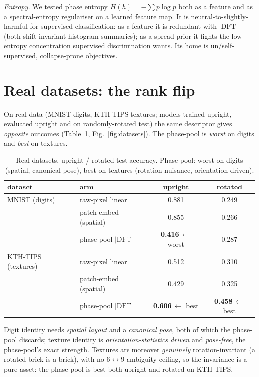 \documentclass[11pt]{article}
\begin{document}
\emph{Entropy.} We tested phase entropy $H(h)=-\sum p\log p$ both as a feature and as a
spectral-entropy regulariser on a learned feature map. It is neutral-to-slightly-harmful for
supervised classification: as a feature it is redundant with $|\mathrm{DFT}|$ (both shift-invariant
histogram summaries); as a spread prior it fights the low-entropy concentration supervised
discrimination wants. Its home is un/self-supervised, collapse-prone objectives.

\section{Real datasets: the rank flip}
On real data (MNIST digits, KTH-TIPS textures; models trained upright, evaluated upright and on
randomly-rotated test) the same descriptor gives \emph{opposite} outcomes (Table~\ref{tab:real},
Fig.~\ref{fig:datasets}). The phase-pool is \emph{worst} on digits and \emph{best} on textures.

\begin{table}[t]
\centering
\caption{Real datasets, upright / rotated test accuracy. Phase-pool: worst on digits (spatial,
canonical pose), best on textures (rotation-nuisance, orientation-driven).}
\label{tab:real}
\begin{tabular}{llcc}
\toprule
dataset & arm & upright & rotated \\
\midrule
MNIST (digits) & raw-pixel linear & 0.881 & 0.249 \\
 & patch-embed (spatial) & 0.855 & 0.266 \\
 & phase-pool $|\mathrm{DFT}|$ & \textbf{0.416}\,$\leftarrow$ worst & 0.287 \\
\midrule
KTH-TIPS (textures) & raw-pixel linear & 0.512 & 0.310 \\
 & patch-embed (spatial) & 0.429 & 0.325 \\
 & phase-pool $|\mathrm{DFT}|$ & \textbf{0.606}\,$\leftarrow$ best & \textbf{0.458}\,$\leftarrow$ best \\
\bottomrule
\end{tabular}
\end{table}

Digit identity needs \emph{spatial layout} and a \emph{canonical pose}, both of which the phase-pool
discards; texture identity is \emph{orientation-statistics driven} and \emph{pose-free}, the
phase-pool's exact strength. Textures are moreover \emph{genuinely} rotation-invariant (a rotated
brick is a brick), with no $6\!\leftrightarrow\!9$ ambiguity ceiling, so the invariance is a pure
asset: the phase-pool is best both upright and rotated on KTH-TIPS.
\end{document}
